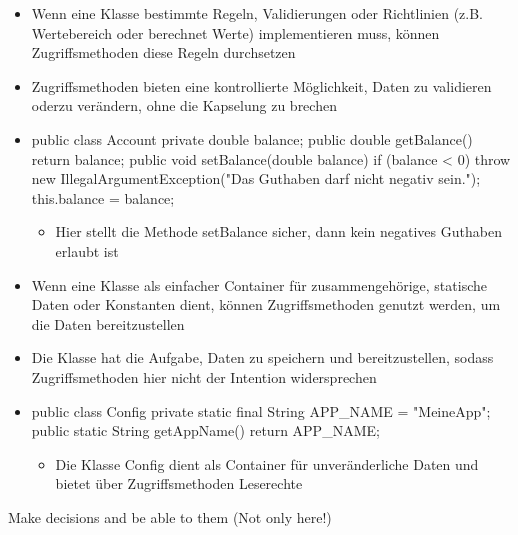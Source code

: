 \begin{infoBox}[title=Durchsetzung von Regeln oder Richtlinien]
    \begin{itemize}
        \item {} Wenn eine Klasse bestimmte Regeln, Validierungen oder Richtlinien (z.B. Wertebereich oder berechnet Werte) implementieren muss, können Zugriffsmethoden diese Regeln durchsetzen
        \item {} Zugriffsmethoden bieten eine kontrollierte Möglichkeit, Daten zu validieren oderzu verändern, ohne die Kapselung zu brechen
        \item {}
        \begin{codeBlock}{}
            public class Account {
                private double balance;
                public double getBalance() {
                    return balance;
                }
                public void setBalance(double balance) {
                    if (balance < 0) {
                        throw new IllegalArgumentException("Das Guthaben darf nicht negativ sein.");
                    }
                    this.balance = balance;
                }
            }
        \end{codeBlock}
        \begin{itemize}
            \item Hier stellt die Methode setBalance sicher, dann kein negatives Guthaben erlaubt ist
        \end{itemize}
    \end{itemize}
\end{infoBox}
\begin{infoBox}[title=Statische Container ohne Verhalten]
    \begin{itemize}
        \item {} Wenn eine Klasse als einfacher Container für zusammengehörige, statische Daten oder Konstanten dient, können Zugriffsmethoden genutzt werden, um die Daten bereitzustellen
        \item {} Die Klasse hat die Aufgabe, Daten zu speichern und bereitzustellen, sodass Zugriffsmethoden hier nicht der Intention widersprechen
        \item {}
        \begin{codeBlock}{}
            public class Config {
                private static final String APP_NAME = "MeineApp";
                public static String getAppName() {
                    return APP_NAME;
                }
            }
        \end{codeBlock}
        \begin{itemize}
            \item Die Klasse Config dient als Container für unveränderliche Daten und bietet über Zugriffsmethoden Leserechte
        \end{itemize}
    \end{itemize}
\end{infoBox}
\begin{defBox}
    Make decisions  and be able to  them (Not only here!)
\end{defBox}
